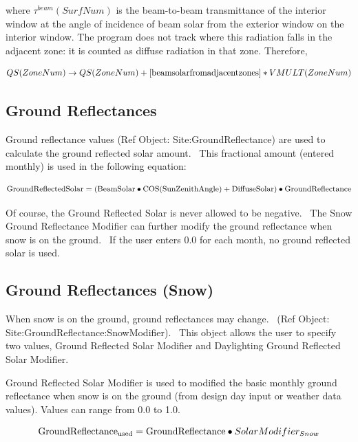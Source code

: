 where \({\tau ^{beam}}(SurfNum)\) is the beam-to-beam transmittance of the interior window at the angle of incidence of beam solar from the exterior window on the interior window. The program does not track where this radiation falls in the adjacent zone: it is counted as diffuse radiation in that zone. Therefore,

\begin{equation}
QS(ZoneNum) \to QS(ZoneNum) + [{\rm{beam solar from adjacent zones]}}*VMULT(ZoneNum)
\end{equation}

\subsection{Ground Reflectances}\label{ground-reflectances}

Ground reflectance values (Ref Object: Site:GroundReflectance) are used to calculate the ground reflected solar amount.~ This fractional amount (entered monthly) is used in the following equation:

\begin{equation}
{\rm{GroundReflectedSolar = (BeamSolar}} \bullet {\rm{COS(SunZenithAngle) + DiffuseSolar)}} \bullet {\rm{GroundReflectance}}
\end{equation}

Of course, the Ground Reflected Solar is never allowed to be negative.~ The Snow Ground Reflectance Modifier can further modify the ground reflectance when snow is on the ground.~ If the user enters 0.0 for each month, no ground reflected solar is used.

\subsection{Ground Reflectances (Snow)}\label{ground-reflectances-snow}

When snow is on the ground, ground reflectances may change.~ (Ref Object: \\
Site:GroundReflectance:SnowModifier).~ This object allows the user to specify two values, Ground Reflected Solar Modifier and Daylighting Ground Reflected Solar Modifier.

Ground Reflected Solar Modifier is used to modified the basic monthly ground reflectance when snow is on the ground (from design day input or weather data values). Values can range from 0.0 to 1.0.

\begin{equation}
{\rm{GroundReflectanc}}{{\rm{e}}_{{\rm{used}}}} = {\rm{GroundReflectance}} \bullet SolarModifie{r_{Snow}}
\end{equation}


